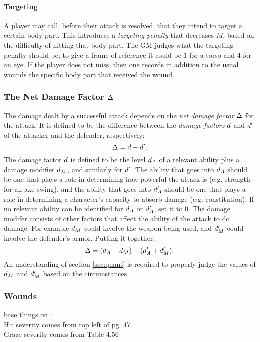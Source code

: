 \documentclass[12pt]{article}
\newcommand{\notes}[1]{{\color{Tan} #1}}
\newcommand{\emdex}[1]{\emph{#1}\index{#1}}
\begin{document}
\paragraph{Targeting}
A player may call, before their attack is resolved, that they intend to target a certain body part.
This introduces a \emdex{targeting penalty} that decreases $M$, based on the difficulty of hitting that body part.
The GM judges what the targeting penalty should be;
to give a frame of reference it could be $1$ for a torso and $4$ for an eye.
If the player does not miss, then one records in addition to the usual wounds the specific body part that received the wound.


\subsubsection{The Net Damage Factor $\Delta$}\label{sec:ndf}
The damage dealt by a successful attack depends on the \emdex{net damage factor} $\Delta$
for the attack. It is defined to be the difference between the \emph{damage factors} $d$ 
and $d'$ of the attacker and the defender, respectively:
$$ \Delta = d - d'. $$
The damage factor $d$ is defined to be the level $d_A$ of a relevant ability
plus a damage modifier $d_M$, and similarly for $d'$.
The ability that goes into $d_A$ should be one that plays a role in determining how
powerful the attack is (e.g. strength for an axe swing), and the ability that goes into $d_A'$
should be one that plays a role in determining a character's capacity to absorb damage (e.g. constitution). 
If no relevant ability can be identified for $d_A$ or $d_A'$, set it to $0$. 
The damage modifer consists of other factors that affect the ability of the attack to do damage.
For example $d_M$ could involve the weapon being used, and $d_M'$ could involve the defender's armor.
Putting it together,
$$ \Delta = (d_A + d_M) - (d_A' + d_M'). $$
An understanding of section \ref{sec:quant} is required to properly judge the values of $d_M$ and $d_M'$
based on the circumstances.





\subsubsection{Wounds}\label{sec:wounds}

\notes{base things on :\\
			Hit severity comes from top left of pg. 47\\
			Graze severity comes from Table 4.56
}
\end{document}
